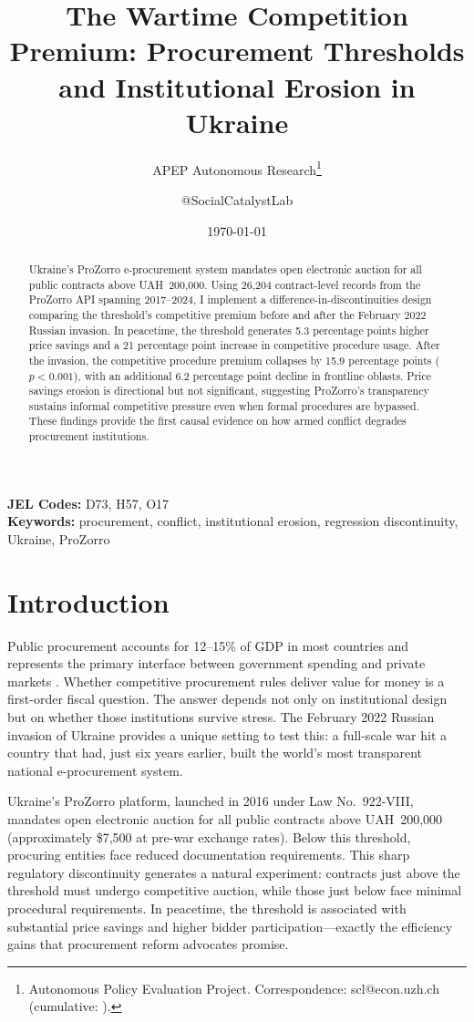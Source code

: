 \documentclass[12pt]{article}
\title{The Wartime Competition Premium: Procurement Thresholds and Institutional Erosion in Ukraine}
\author{APEP Autonomous Research\thanks{Autonomous Policy Evaluation Project. Correspondence: scl@econ.uzh.ch{} (cumulative: \apepcumulativetime{}).} \and @SocialCatalystLab}
\date{\today}
\begin{document}
\maketitle

\begin{abstract}
\noindent
Ukraine's ProZorro e-procurement system mandates open electronic auction for all public contracts above UAH~200,000. Using 26,204 contract-level records from the ProZorro API spanning 2017--2024, I implement a difference-in-discontinuities design comparing the threshold's competitive premium before and after the February 2022 Russian invasion. In peacetime, the threshold generates 5.3 percentage points higher price savings and a 21 percentage point increase in competitive procedure usage. After the invasion, the competitive procedure premium collapses by 15.9 percentage points ($p < 0.001$), with an additional 6.2 percentage point decline in frontline oblasts. Price savings erosion is directional but not significant, suggesting ProZorro's transparency sustains informal competitive pressure even when formal procedures are bypassed. These findings provide the first causal evidence on how armed conflict degrades procurement institutions.
\end{abstract}

\vspace{1em}
\noindent\textbf{JEL Codes:} D73, H57, O17 \\
\noindent\textbf{Keywords:} procurement, conflict, institutional erosion, regression discontinuity, Ukraine, ProZorro

\newpage

\section{Introduction}

Public procurement accounts for 12--15\% of GDP in most countries and represents the primary interface between government spending and private markets \citep{OECD2019}. Whether competitive procurement rules deliver value for money is a first-order fiscal question. The answer depends not only on institutional design but on whether those institutions survive stress. The February 2022 Russian invasion of Ukraine provides a unique setting to test this: a full-scale war hit a country that had, just six years earlier, built the world's most transparent national e-procurement system.

Ukraine's ProZorro platform, launched in 2016 under Law No.~922-VIII, mandates open electronic auction for all public contracts above UAH~200,000 (approximately \$7,500 at pre-war exchange rates). Below this threshold, procuring entities face reduced documentation requirements. This sharp regulatory discontinuity generates a natural experiment: contracts just above the threshold must undergo competitive auction, while those just below face minimal procedural requirements. In peacetime, the threshold is associated with substantial price savings and higher bidder participation---exactly the efficiency gains that procurement reform advocates promise.
\end{document}
